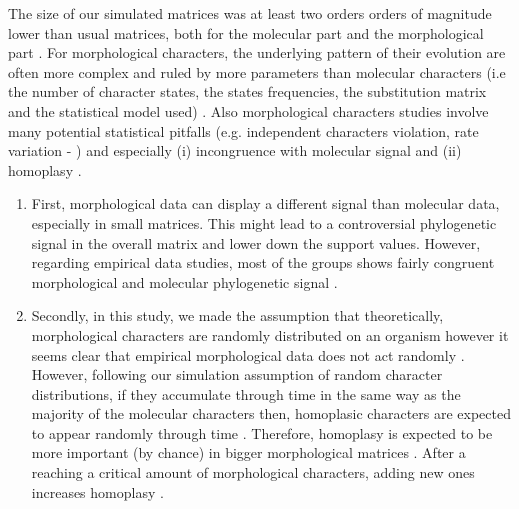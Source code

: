 \documentclass[12pt,letterpaper]{article}
\begin{document}
The size of our simulated matrices was at least two orders orders of magnitude lower than usual matrices, both for the molecular part \citep[e.g.][]{springermacroevolutionary2012} and the morphological part \citep[e.g.][]{nithe2013}. For morphological characters, the underlying pattern of their evolution are often more complex and ruled by more parameters than molecular characters (i.e the number of character states, the states frequencies, the substitution matrix and the statistical model used) \citep{Pagel22011994,wagner2000,lewisa2001}. Also morphological characters studies involve many potential statistical pitfalls (e.g. independent characters violation, rate variation - \citet{davalosintegrating2014}) and especially (i) incongruence with molecular signal and (ii) homoplasy \citep{wrightbayesian2014}.
\begin{enumerate}
\item{First, morphological data can display a different signal than molecular data, especially in small matrices. %
This might lead to a controversial phylogenetic signal in the overall matrix and lower down the support values. However, regarding empirical data studies, most of the groups shows fairly congruent morphological and molecular phylogenetic signal \citep[e.g.][]{leerates2013}.}
\item{Secondly, in this study, we made the assumption that theoretically, morphological characters are randomly distributed on an organism however it seems clear that empirical morphological data does not act randomly \citep{sansomfossilization2013}. However, following our simulation assumption of random character distributions, if they accumulate through time in the same way as the majority of the molecular characters then, homoplasic characters are expected to appear randomly through time \citep{davalosintegrating2014}. Therefore, homoplasy is expected to be more important (by chance) in bigger morphological matrices \citep{davalosintegrating2014}. After a reaching a critical amount of morphological characters, adding new ones increases homoplasy \citep{wagner2000}.}
\end{enumerate}
\end{document}
